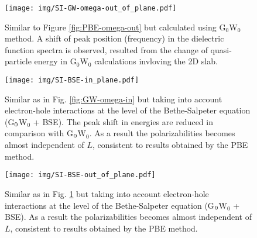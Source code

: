 \documentclass[manuscript=suppinfo,email=true,hyperref=true,keywords=false]{achemso}
\begin{document}
\begin{figure}[htbp]
  \centering
 \texttt{[image: img/SI-GW-omega-out\_of\_plane.pdf]}
 \caption{Similar to Figure \ref{fig:PBE-omega-out} but calculated
   using G$_{0}$W$_{0}$ method.  A shift of peak position (frequency)
   in the dielectric function spectra is observed, resulted from the
   change of quasi-particle energy in G$_{0}$W$_{0}$ calculations
   invloving the 2D slab.}
  \label{fig:GW-omega-out}
\end{figure}


\begin{figure}[htbp]
  \centering
 \texttt{[image: img/SI-BSE-in\_plane.pdf]}
 \caption{Similar as in Fig. \ref{fig:GW-omega-in} but taking into
   account electron-hole interactions at the level of the
   Bethe-Salpeter equation (G$_{\rm 0}$W$_{0}$ + BSE).  The peak shift
   in energies are reduced in comparison with G$_{\rm 0}$W$_{0}$. As a
   result the polarizabilities becomes almost independent of $L$,
   consistent to results obtained by the PBE method.}
  \label{fig:BSE-omega-in}
\end{figure}

\begin{figure}[htbp]
  \centering
 \texttt{[image: img/SI-BSE-out\_of\_plane.pdf]}
 \caption{Similar as in Fig. \ref{fig:GW-omega-out} but taking into
   account electron-hole interactions at the level of the
   Bethe-Salpeter equation (G$_{\rm 0}$W$_{0}$ + BSE).  As a result
   the polarizabilities becomes almost independent of $L$, consistent
   to results obtained by the PBE method.}
  \label{fig:BSE-omega-out}
\end{figure}

%
%
\end{document}
